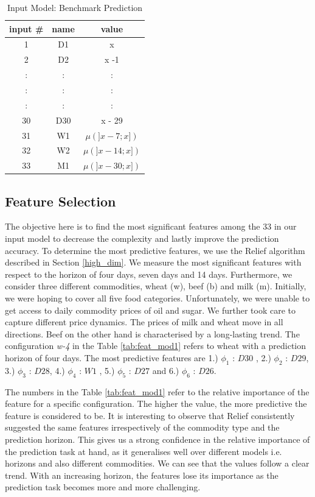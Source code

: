 \begin{table}[H]
\centering
\begin{tabular}{ |c|c|c| } 

 input \# & name & value \\ 
  \hline
 1 & D1 & x \\ 
 2 & D2 & x -1 \\ 
 :& : & : \\ 
  :& : & : \\ 
  :& : & : \\ 
  30 & D30 & x - 29\\ 
  31 & W1 & $\mu(]x-7;x])$ \\ 
  32 & W2 & $\mu(]x-14;x])$ \\ 
  33 & M1 & $\mu(]x-30;x])$ \\ 
 

\end{tabular}
\caption{Input Model: Benchmark Prediction}
\label{tab:inputModel}
\end{table}


\subsection{Feature Selection}
\label{featSel_bench}


The objective here is to find the most significant features among the 33 in our input model to decrease the complexity and lastly improve the prediction accuracy.  To determine the most predictive features, we use the Relief algorithm described in Section \ref{high_dim}. We measure the most significant features with respect to the horizon of four days, seven days and 14 days. Furthermore, we consider three different commodities, wheat (w), beef (b) and milk (m). Initially, we were hoping to cover all five food categories. Unfortunately, we were unable to get access to daily commodity prices of oil and sugar. We further took care to capture different price dynamics. The prices of milk and wheat move in all directions. Beef on the other hand is characterised by a long-lasting trend. The configuration \emph{w-4} in the Table \ref{tab:feat_mod1} refers to wheat with a prediction horizon of four days. The most predictive features are  1.) $\phi_1$ : $D30$ , 2.) $\phi_2$ : $D29$,  3.) $\phi_3$ : $D28$, 4.) $\phi_4$ : $W1$ , 5.) $\phi_5$ : $D27$ and 6.) $\phi_6$ : $D26$.

The numbers in the Table \ref{tab:feat_mod1} refer to the relative importance of the feature for a specific configuration. The higher the value, the more predictive the feature is considered to be. It is interesting to observe that Relief consistently suggested the same features irrespectively of the commodity type and the prediction horizon. This gives us a strong confidence in the relative importance of the prediction task at hand, as it generalises well over different models i.e. horizons and also different commodities. We can see that the values follow a clear trend. With an increasing horizon, the features lose its importance as the prediction task becomes more and more challenging. 


